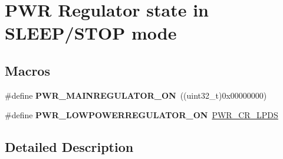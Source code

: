 \hypertarget{group___p_w_r___regulator__state__in___s_t_o_p__mode}{}\section{P\+WR Regulator state in S\+L\+E\+E\+P/\+S\+T\+OP mode}
\label{group___p_w_r___regulator__state__in___s_t_o_p__mode}
\subsection*{Macros}
\begin{DoxyCompactItemize}
\item 
\#define {\bfseries P\+W\+R\+\_\+\+M\+A\+I\+N\+R\+E\+G\+U\+L\+A\+T\+O\+R\+\_\+\+ON}~((uint32\+\_\+t)0x00000000)\hypertarget{group___p_w_r___regulator__state__in___s_t_o_p__mode_ga1d5b4e1482184286e28c16162f530039}{}\label{group___p_w_r___regulator__state__in___s_t_o_p__mode_ga1d5b4e1482184286e28c16162f530039}

\item 
\#define {\bfseries P\+W\+R\+\_\+\+L\+O\+W\+P\+O\+W\+E\+R\+R\+E\+G\+U\+L\+A\+T\+O\+R\+\_\+\+ON}~\hyperlink{group___peripheral___registers___bits___definition_ga3aeb8d6f2539b0a3a4b851aeba0eea66}{P\+W\+R\+\_\+\+C\+R\+\_\+\+L\+P\+DS}\hypertarget{group___p_w_r___regulator__state__in___s_t_o_p__mode_gab9922a15f8414818d736d5e7fcace963}{}\label{group___p_w_r___regulator__state__in___s_t_o_p__mode_gab9922a15f8414818d736d5e7fcace963}

\end{DoxyCompactItemize}


\subsection{Detailed Description}
